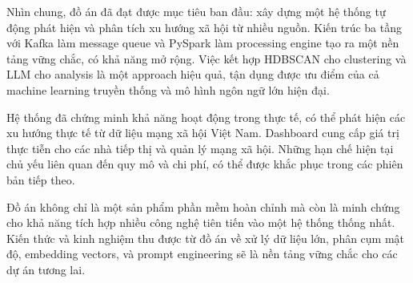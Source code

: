 Nhìn chung, đồ án đã đạt được mục tiêu ban đầu: xây dựng một hệ thống tự động phát hiện và phân tích xu hướng xã hội từ nhiều nguồn. Kiến trúc ba tầng với Kafka làm message queue và PySpark làm processing engine tạo ra một nền tảng vững chắc, có khả năng mở rộng. Việc kết hợp HDBSCAN cho clustering và LLM cho analysis là một approach hiệu quả, tận dụng được ưu điểm của cả machine learning truyền thống và mô hình ngôn ngữ lớn hiện đại.

Hệ thống đã chứng minh khả năng hoạt động trong thực tế, có thể phát hiện các xu hướng thực tế từ dữ liệu mạng xã hội Việt Nam. Dashboard cung cấp giá trị thực tiễn cho các nhà tiếp thị và quản lý mạng xã hội. Những hạn chế hiện tại chủ yếu liên quan đến quy mô và chi phí, có thể được khắc phục trong các phiên bản tiếp theo.

Đồ án không chỉ là một sản phẩm phần mềm hoàn chỉnh mà còn là minh chứng cho khả năng tích hợp nhiều công nghệ tiên tiến vào một hệ thống thống nhất. Kiến thức và kinh nghiệm thu được từ đồ án về xử lý dữ liệu lớn, phân cụm mật độ, embedding vectors, và prompt engineering sẽ là nền tảng vững chắc cho các dự án tương lai.
